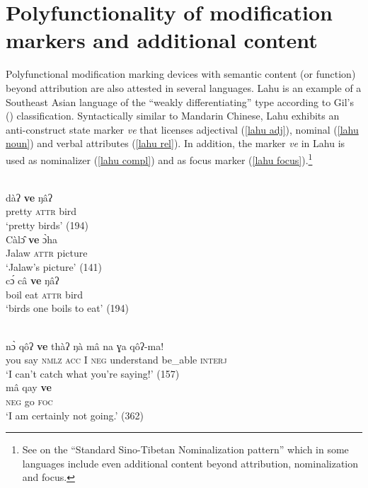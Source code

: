 \section[Polyfunctionality and additional content]{Polyfunctionality of modification markers and additional content}
Polyfunctional modification marking devices with semantic content (or function) beyond attribution are also attested in several languages. Lahu is an example of a Southeast Asian language of the “weakly differentiating” type according to Gil's (\citeyear{gil2005}) classification. Syntactically similar to Mandarin Chinese, Lahu exhibits an anti-construct state marker \textit{ve} that licenses adjectival (\ref{lahu adj}), nominal (\ref{lahu noun}) and verbal attributes (\ref{lahu rel}). In addition, the marker \textit{ve} in Lahu is used as nominalizer (\ref{lahu compl}) and as focus marker (\ref{lahu focus}).\footnote{See \citealt{bickel1999} on the “Standard Sino-Tibetan Nominalization pattern” which in some languages include even additional content beyond attribution, nominalization and focus.}
\begin{exe}
\ex
{}
\begin{xlist}
\begin{xlist}
\\
\gll	dàʔ	\textbf{ve}	ŋâʔ\\
	pretty	\textsc{attr}	bird\\
\glt	‘pretty birds’ (194)\label{lahu adj}
\\
\gll	Càl\^{ɔ}	\textbf{ve}	\`{ɔ}ha\\
	Jalaw	\textsc{attr}	picture\\
\glt	‘Jalaw's picture’ (141)\label{lahu noun}
\\
\gll	c\'{ɔ}	câ	\textbf{ve}	ŋâʔ\\
	boil	eat	\textsc{attr}	bird\\
\glt	‘birds one boils to eat’ (194)\label{lahu rel}
\end{xlist}
\begin{xlist}
\\
\gll	n\`{ɔ}	qôʔ \textbf{ve}	thàʔ	ŋà mâ	na ɣa	qôʔ-ma!\\
	you	say \textsc{nmlz}	\textsc{acc} I	\textsc{neg} understand	be\_able	\textsc{interj}\\
\glt	‘I can't catch what you're saying!’ (157)\label{lahu compl}
\\
\gll	mâ		qay	\textbf{ve}\\
	\textsc{neg}	go	\textsc{foc}\\
\glt	‘I am certainly not going.’ (362)\label{lahu focus}
\end{xlist}
\end{xlist}
\end{exe}
